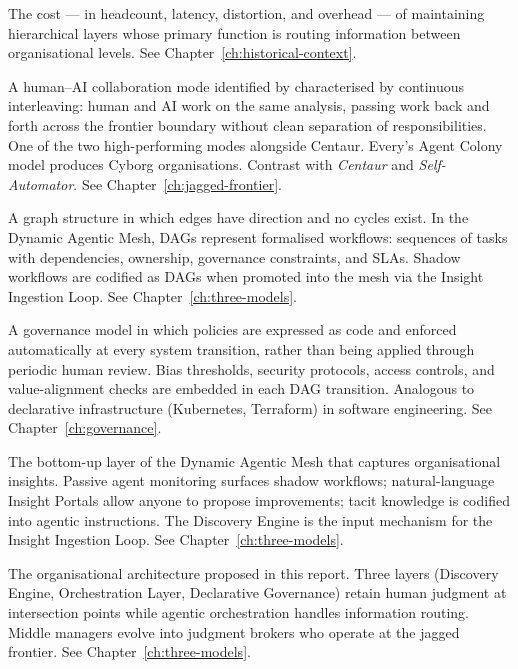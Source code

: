 \begin{description}[style=nextline, leftmargin=2em, font=\bfseries\color{navyblue}]
\item[Coordination Tax]
The cost --- in headcount, latency, distortion, and overhead --- of maintaining hierarchical layers whose primary function is routing information between organisational levels. See Chapter~\ref{ch:historical-context}.

\item[Cyborg]
A human--AI collaboration mode identified by \textcite{Randazzo2024} characterised by continuous interleaving: human and AI work on the same analysis, passing work back and forth across the frontier boundary without clean separation of responsibilities. One of the two high-performing modes alongside Centaur. Every's Agent Colony model produces Cyborg organisations. Contrast with \emph{Centaur} and \emph{Self-Automator}. See Chapter~\ref{ch:jagged-frontier}.

\item[DAG (Directed Acyclic Graph)]
A graph structure in which edges have direction and no cycles exist. In the Dynamic Agentic Mesh, DAGs represent formalised workflows: sequences of tasks with dependencies, ownership, governance constraints, and SLAs. Shadow workflows are codified as DAGs when promoted into the mesh via the Insight Ingestion Loop. See Chapter~\ref{ch:three-models}.

\item[Declarative Governance]
A governance model in which policies are expressed as code and enforced automatically at every system transition, rather than being applied through periodic human review. Bias thresholds, security protocols, access controls, and value-alignment checks are embedded in each DAG transition. Analogous to declarative infrastructure (Kubernetes, Terraform) in software engineering. See Chapter~\ref{ch:governance}.

\item[Discovery Engine]
The bottom-up layer of the Dynamic Agentic Mesh that captures organisational insights. Passive agent monitoring surfaces shadow workflows; natural-language Insight Portals allow anyone to propose improvements; tacit knowledge is codified into agentic instructions. The Discovery Engine is the input mechanism for the Insight Ingestion Loop. See Chapter~\ref{ch:three-models}.

\item[Dynamic Agentic Mesh]
The organisational architecture proposed in this report. Three layers (Discovery Engine, Orchestration Layer, Declarative Governance) retain human judgment at intersection points while agentic orchestration handles information routing. Middle managers evolve into judgment brokers who operate at the jagged frontier. See Chapter~\ref{ch:three-models}.


\end{description}
